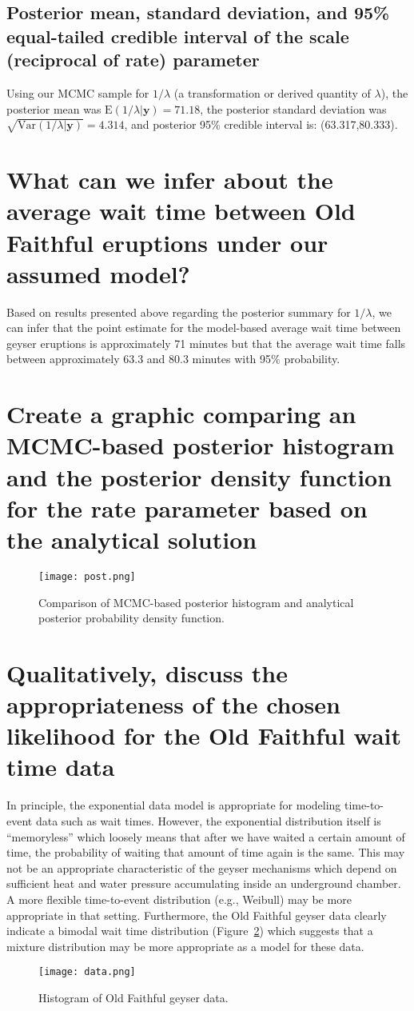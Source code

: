 \documentclass[12pt]{article} \topmargin=.1in \oddsidemargin=.25in
\begin{document}
\subsection{Posterior mean, standard deviation, and 95\% equal-tailed credible interval of the scale (reciprocal of rate) parameter}
Using our MCMC sample for $1/\lambda$ (a transformation or derived quantity of $\lambda$), the posterior mean was $\text{E}(1/\lambda|\mathbf{y})=71.18$, the posterior standard deviation was $\sqrt{\text{Var}(1/\lambda|\mathbf{y})}=4.314$, and posterior 95\% credible interval is: (63.317,80.333).
\section{What can we infer about the average wait time between Old Faithful eruptions under our assumed model?}
Based on results presented above regarding the posterior summary for $1/\lambda$, we can infer that the point estimate for the model-based average wait time between geyser eruptions is approximately 71 minutes but that the average wait time falls between approximately 63.3 and 80.3 minutes with 95\% probability.  

\section{Create a graphic comparing an MCMC-based posterior histogram and the posterior density function for the rate parameter based on the analytical solution}
\begin{figure}[h]
  \centering
  \texttt{[image: post.png]}  
  \caption{Comparison of MCMC-based posterior histogram and analytical posterior probability density function.}
  \label{fig:post}
\end{figure}

\section{Qualitatively, discuss the appropriateness of the chosen likelihood for the Old Faithful wait time data}
In principle, the exponential data model is appropriate for modeling time-to-event data such as wait times.  However, the exponential distribution itself is ``memoryless'' which loosely means that after we have waited a certain amount of time, the probability of waiting that amount of time again is the same.  This may not be an appropriate characteristic of the geyser mechanisms which depend on sufficient heat and water pressure accumulating inside an underground chamber.  A more flexible time-to-event distribution (e.g., Weibull) may be more appropriate in that setting.  Furthermore, the Old Faithful geyser data clearly indicate a bimodal wait time distribution (Figure~\ref{fig:data}) which suggests that a mixture distribution may be more appropriate as a model for these data.   
\begin{figure}[h]
  \centering
  \texttt{[image: data.png]}  
  \caption{Histogram of Old Faithful geyser data.}
  \label{fig:data}
\end{figure}
\end{document}
